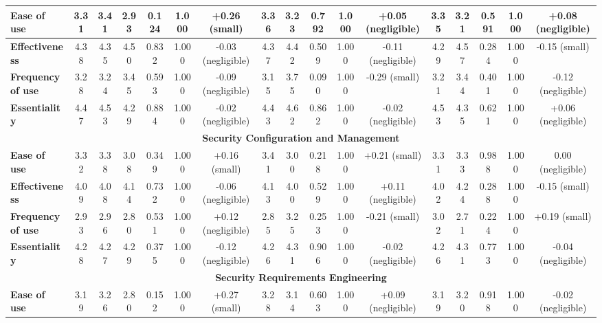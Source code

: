 \begin{tiny}
\begin{longtable}{@{}lcccccccccccccccc@{}}
\textbf{Ease of use} & 3.31 & 3.41 & 2.93 & 0.124 & 1.000 & \multicolumn{1}{c|}{+0.26 (small)} & 3.36 & 3.23 & 0.792 & 1.000 & \multicolumn{1}{c|}{+0.05 (negligible)} & 3.35 & 3.21 & 0.591 & 1.000 & +0.08 (negligible) \\ \midrule
\textbf{Effectiveness} & 4.38 & 4.35 & 4.50 & 0.832 & 1.000 & \multicolumn{1}{c|}{-0.03 (negligible)} & 4.37 & 4.42 & 0.509 & 1.000 & \multicolumn{1}{c|}{-0.11 (negligible)} & 4.29 & 4.57 & 0.284 & 1.000 & -0.15 (small) \\ \midrule
\textbf{Frequency of use} & 3.28 & 3.24 & 3.45 & 0.593 & 1.000 & \multicolumn{1}{c|}{-0.09 (negligible)} & 3.15 & 3.75 & 0.090 & 1.000 & \multicolumn{1}{c|}{-0.29 (small)} & 3.21 & 3.44 & 0.401 & 1.000 & -0.12 (negligible) \\ \midrule
\textbf{Essentiality} & 4.47 & 4.53 & 4.29 & 0.884 & 1.000 & \multicolumn{1}{c|}{-0.02 (negligible)} & 4.43 & 4.62 & 0.862 & 1.000 & \multicolumn{1}{c|}{-0.02 (negligible)} & 4.53 & 4.35 & 0.621 & 1.000 & +0.06 (negligible) \\ \midrule
\multicolumn{17}{c}{\textbf{Security Configuration and Management}} \\ \midrule
\textbf{Ease of use} & 3.32 & 3.38 & 3.08 & 0.349 & 1.000 & \multicolumn{1}{c|}{+0.16 (small)} & 3.41 & 3.00 & 0.218 & 1.000 & \multicolumn{1}{c|}{+0.21 (small)} & 3.31 & 3.33 & 0.988 & 1.000 & 0.00 (negligible) \\ \midrule
\textbf{Effectiveness} & 4.09 & 4.08 & 4.14 & 0.732 & 1.000 & \multicolumn{1}{c|}{-0.06 (negligible)} & 4.13 & 4.00 & 0.529 & 1.000 & \multicolumn{1}{c|}{+0.11 (negligible)} & 4.02 & 4.24 & 0.288 & 1.000 & -0.15 (small) \\ \midrule
\textbf{Frequency of use} & 2.93 & 2.96 & 2.80 & 0.531 & 1.000 & \multicolumn{1}{c|}{+0.12 (negligible)} & 2.85 & 3.25 & 0.253 & 1.000 & \multicolumn{1}{c|}{-0.21 (small)} & 3.02 & 2.71 & 0.224 & 1.000 & +0.19 (small) \\ \midrule
\textbf{Essentiality} & 4.28 & 4.27 & 4.29 & 0.375 & 1.000 & \multicolumn{1}{c|}{-0.12 (negligible)} & 4.26 & 4.31 & 0.906 & 1.000 & \multicolumn{1}{c|}{-0.02 (negligible)} & 4.26 & 4.31 & 0.773 & 1.000 & -0.04 (negligible) \\ \midrule
\multicolumn{17}{c}{\textbf{Security Requirements Engineering}} \\ \midrule
\textbf{Ease of use} & 3.19 & 3.26 & 2.80 & 0.152 & 1.000 & \multicolumn{1}{c|}{+0.27 (small)} & 3.28 & 3.14 & 0.603 & 1.000 & \multicolumn{1}{c|}{+0.09 (negligible)} & 3.19 & 3.20 & 0.918 & 1.000 & -0.02 (negligible) \\ \midrule

\end{longtable}
\end{tiny}
